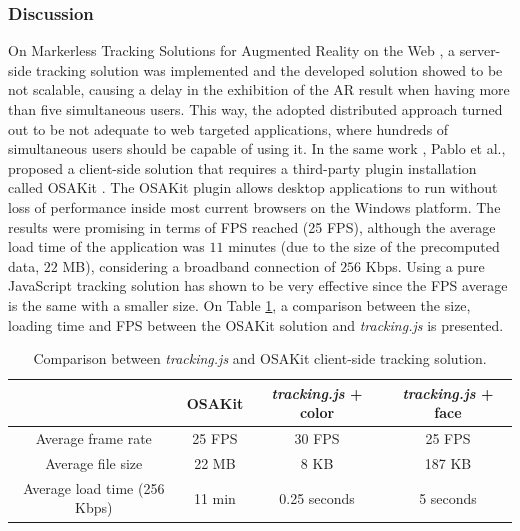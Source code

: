 \subsubsection{Discussion} %
\label{subsub:evaluation:results:js_tracking_solution:description}

On Markerless Tracking Solutions for Augmented Reality on the Web \cite{Pablo2013}, a server-side tracking solution was implemented and the developed solution showed to be not scalable, causing a delay in the exhibition of the AR result when having more than five simultaneous users. This way, the adopted distributed approach turned out to be not adequate to web targeted applications, where hundreds of simultaneous users should be capable of using it. In the same work \cite{Pablo2013}, Pablo et al., proposed a client-side solution that requires a third-party plugin installation called OSAKit \cite{OSAKit2013}. The OSAKit plugin allows desktop applications to run without loss of performance inside most current browsers on the Windows platform. The results were promising in terms of FPS reached (25 FPS), although the average load time of the application was $11$ minutes (due to the size of the precomputed data, $22$ MB), considering a broadband connection of $256$ Kbps. Using a pure JavaScript tracking solution has shown to be very effective since the FPS average is the same with a smaller size. On Table \ref{table:comparison_with_osakit}, a comparison between the size, loading time and FPS between the OSAKit solution and \textit{tracking.js} is presented.

\begin{table}[!htb]
    \centering %
    \begin{tabular}{|c|c|c|c|}
        \hline
        & OSAKit & \textit{tracking.js} + color & \textit{tracking.js} + face \\
        \hline
        Average frame rate & 25 FPS & 30 FPS & 25 FPS\\
        \hline
        Average file size & 22 MB & 8 KB & 187 KB\\
        \hline
        Average load time (256 Kbps) & 11 min & 0.25 seconds & 5 seconds\\
        \hline
    \end{tabular}
    \caption{Comparison between \textit{tracking.js} and OSAKit client-side tracking solution.}
    \label{table:comparison_with_osakit}
\end{table}



